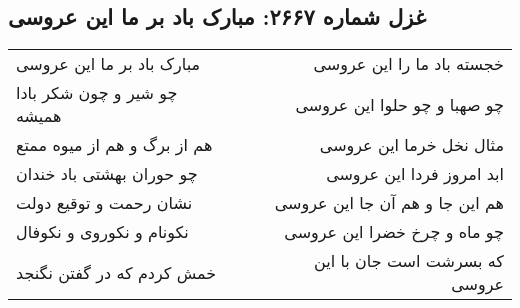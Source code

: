\begin{center}
\section*{غزل شماره ۲۶۶۷: مبارک باد بر ما این عروسی}
\label{sec:2667}
\begin{longtable}{l p{0.5cm} r}
مبارک باد بر ما این عروسی
&&
خجسته باد ما را این عروسی
\\
چو شیر و چون شکر بادا همیشه
&&
چو صهبا و چو حلوا این عروسی
\\
هم از برگ و هم از میوه ممتع
&&
مثال نخل خرما این عروسی
\\
چو حوران بهشتی باد خندان
&&
ابد امروز فردا این عروسی
\\
نشان رحمت و توقیع دولت
&&
هم این جا و هم آن جا این عروسی
\\
نکونام و نکوروی و نکوفال
&&
چو ماه و چرخ خضرا این عروسی
\\
خمش کردم که در گفتن نگنجد
&&
که بسرشت است جان با این عروسی
\\
\end{longtable}
\end{center}
